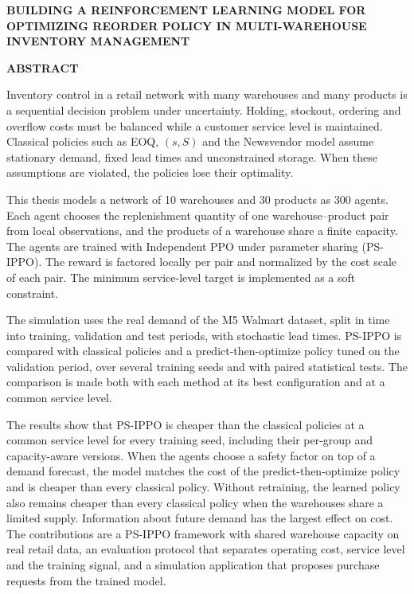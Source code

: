 \newpage
\begin{center}
{\fontsize{15pt}{18pt}\selectfont \textbf{BUILDING A REINFORCEMENT LEARNING MODEL FOR OPTIMIZING REORDER POLICY IN MULTI-WAREHOUSE INVENTORY MANAGEMENT}\par}
\vspace{0.5cm}
{\fontsize{16pt}{19.2pt}\selectfont \textbf{ABSTRACT}\par}
\end{center}
\vspace{0.2cm}

Inventory control in a retail network with many warehouses and many products is a sequential decision problem under uncertainty. Holding, stockout, ordering and overflow costs must be balanced while a customer service level is maintained. Classical policies such as EOQ, $(s, S)$ and the Newsvendor model assume stationary demand, fixed lead times and unconstrained storage. When these assumptions are violated, the policies lose their optimality.

This thesis models a network of 10 warehouses and 30 products as 300 agents. Each agent chooses the replenishment quantity of one warehouse--product pair from local observations, and the products of a warehouse share a finite capacity. The agents are trained with Independent PPO under parameter sharing (PS-IPPO). The reward is factored locally per pair and normalized by the cost scale of each pair. The minimum service-level target is implemented as a soft constraint.

The simulation uses the real demand of the M5 Walmart dataset, split in time into training, validation and test periods, with stochastic lead times. PS-IPPO is compared with classical policies and a predict-then-optimize policy tuned on the validation period, over several training seeds and with paired statistical tests. The comparison is made both with each method at its best configuration and at a common service level.

The results show that PS-IPPO is cheaper than the classical policies at a common service level for every training seed, including their per-group and capacity-aware versions. When the agents choose a safety factor on top of a demand forecast, the model matches the cost of the predict-then-optimize policy and is cheaper than every classical policy. Without retraining, the learned policy also remains cheaper than every classical policy when the warehouses share a limited supply. Information about future demand has the largest effect on cost. The contributions are a PS-IPPO framework with shared warehouse capacity on real retail data, an evaluation protocol that separates operating cost, service level and the training signal, and a simulation application that proposes purchase requests from the trained model.
